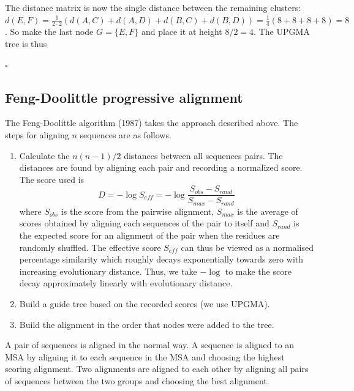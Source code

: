 \documentclass[11pt]{article}
\newcommand{\sqend}{\hfill $\square$}
\begin{document}
The distance matrix is now the single distance between the remaining clusters: $d(E,F) = \frac 1 {2\cdot 2} (d(A,C)+d(A,D) + d(B,C)+d(B,D) ) = \frac 1 4 (8+8+8+8) = 8$. So make the last node $G = \{E,F\}$ and place it at height $8/2 = 4$.  The UPGMA tree is thus

\sqend





\subsection{Feng-Doolittle progressive alignment}

The Feng-Doolittle algorithm (1987) takes the approach described above.  The steps for aligning $n$ sequences are as follows.  
\begin{enumerate}
\item Calculate the $n(n-1)/2$ distances between all sequences pairs.  The distances are found by aligning each pair and recording a normalized score.  The score used is \[D = -\log S_{eff}  = -\log \frac{S_{obs} - S_{rand}}{S_{max} - S_{rand}}\] where $S_{obs}$ is the score from the pairwise alignment, $S_{max}$ is the average of scores obtained by aligning each sequences of the pair to itself and $S_{rand}$ is the expected score for an alignment of the pair when the residues are randomly shuffled. The effective score $S_{eff}$ can thus be
viewed as a normalised percentage similarity which  roughly decays exponentially towards zero with increasing evolutionary distance.  Thus, we take $ -\log$ to
make the score decay approximately linearly with evolutionary distance.
\item Build a guide tree based on the recorded scores (we use UPGMA).
\item Build the alignment in the order that nodes were added to the tree. 
\end{enumerate}
A pair of sequences is aligned in the normal way. A sequence is aligned to an MSA by aligning it to each sequence in the MSA and choosing the highest scoring alignment.  Two alignments  are aligned to each other by aligning all pairs of sequences between the two groups and choosing the best alignment.  
\end{document}
